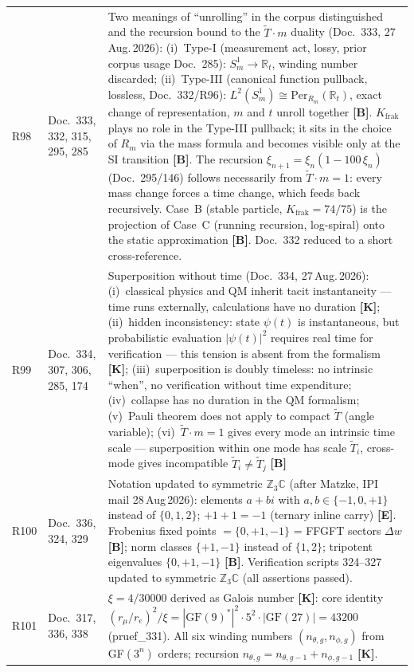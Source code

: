 \begin{longtable}{@{}p{0.9cm}p{3.1cm}p{10.2cm}@{}}
R98 & Doc.~333, 332, 315, 295, 285 & Two meanings of ``unrolling'' in the corpus distinguished and the recursion bound to the $\tilde{T}\cdot m$ duality (Doc.~333, 27\,Aug.\,2026): (i)~Type-I (measurement act, lossy, prior corpus usage Doc.~285): $S^1_m\to\mathbb{R}_t$, winding number discarded; (ii)~Type-III (canonical function pullback, lossless, Doc.~332/R96): $L^2(S^1_m)\cong\mathrm{Per}_{R_m}(\mathbb{R}_t)$, exact change of representation, $m$ and $t$ unroll together \textbf{[B]}. $K_{\text{frak}}$ plays no role in the Type-III pullback; it sits in the choice of $R_m$ via the mass formula and becomes visible only at the SI transition \textbf{[B]}. The recursion $\xi_{n+1}=\xi_n(1-100\,\xi_n)$ (Doc.~295/146) follows necessarily from $\tilde{T}\cdot m=1$: every mass change forces a time change, which feeds back recursively. Case~B (stable particle, $K_{\text{frak}}=74/75$) is the projection of Case~C (running recursion, log-spiral) onto the static approximation \textbf{[B]}. Doc.~332 reduced to a short cross-reference. \\
R99 & Doc.~334, 307, 306, 285, 174 & Superposition without time (Doc.~334, 27\,Aug.\,2026): (i)~classical physics and QM inherit tacit instantaneity — time runs externally, calculations have no duration \textbf{[K]}; (ii)~hidden inconsistency: state $\psi(t)$ is instantaneous, but probabilistic evaluation $|\psi(t)|^2$ requires real time for verification — this tension is absent from the formalism \textbf{[K]}; (iii)~superposition is doubly timeless: no intrinsic ``when'', no verification without time expenditure; (iv)~collapse has no duration in the QM formalism; (v)~Pauli theorem does not apply to compact $\tilde{T}$ (angle variable); (vi)~$\tilde{T}\cdot m=1$ gives every mode an intrinsic time scale — superposition within one mode has scale $\tilde{T}_i$, cross-mode gives incompatible $\tilde{T}_i\neq\tilde{T}_j$ \textbf{[B]} \\
R100 & Doc.~336, 324, 329 & Notation updated to symmetric $\mathbb{Z}_3\mathbb{C}$ (after Matzke, IPI mail 28\,Aug\,2026): elements $a+bi$ with $a,b\in\{-1,0,+1\}$ instead of $\{0,1,2\}$; $+1+1=-1$ (ternary inline carry) \textbf{[E]}. Frobenius fixed points $= \{0,+1,-1\}$ = FFGFT sectors $\Delta w$ \textbf{[B]}; norm classes $\{+1,-1\}$ instead of $\{1,2\}$; tripotent eigenvalues $\{0,+1,-1\}$ \textbf{[B]}. Verification scripts 324--327 updated to symmetric $\mathbb{Z}_3\mathbb{C}$ (all assertions passed). \\
R101 & Doc.~317, 336, 338 & $\xi=4/30000$ derived as Galois number \textbf{[K]}: core identity $(r_\mu/r_e)^2/\xi = |\text{GF}(9)^*|^2\cdot5^2\cdot|\text{GF}(27)| = 43200$ (pruef\_331). All six winding numbers $(n_{\theta,g},n_{\phi,g})$ from GF$(3^n)$ orders; recursion $n_{\theta,g}=n_{\theta,g-1}+n_{\phi,g-1}$ \textbf{[K]}. \\

\end{longtable}
